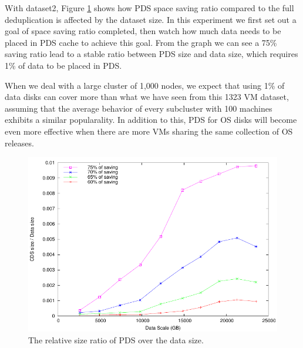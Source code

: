 With dataset2, Figure \ref{fig:datacds} shows how PDS space saving ratio
compared to the full deduplication is affected by the dataset size. 
In this experiment we first set out a goal of space saving ratio completed, 
then watch how much data needs to be placed in PDS cache to achieve this goal.
From the graph we can see a 75\% saving ratio lead to a stable ratio between 
PDS size and data size, which requires 1\% of data to be placed in PDS.

When we deal with a large cluster of 1,000 nodes, we expect that using
1\% of data disks can cover more than what we have seen from this
1323 VM dataset, assuming that the average behavior of every subcluster with 100 machines
exhibits a similar popularality. 
In addition to this, PDS for OS disks will become even more effective when
there are more VMs sharing the same collection of OS releases. 

\begin{figure}
  \centering
  \includegraphics[width=5in]{images/cds_scale_07.pdf}
  \caption{The relative size ratio of  PDS over the data size. }
  \label{fig:datacds}
\end{figure}

